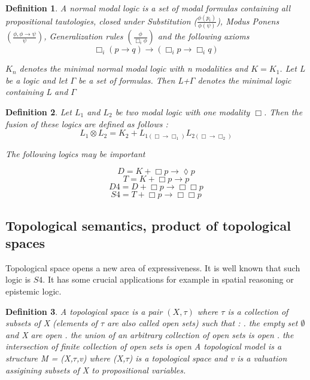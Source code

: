 \documentclass[12pt, a4paper]{scrartcl}
\newtheorem{definition}{Definition}[subsection]
\begin{document}
\begin{definition}
A normal modal logic is a set of modal formulas containing all propositional tautologies,
closed under Substitution ($\frac{\phi(p_i)}{\phi(\psi)}$), Modus Ponens 
$(\frac{\phi, \phi \rightarrow \psi}{\psi})$, Generalization rules $(\frac{\phi}{\Box_i \phi})$
and the following axioms 
$$ \Box_i (p \rightarrow q) \rightarrow (\Box_i p \rightarrow \Box_i q)$$

$K_n$ denotes the minimal normal modal logic with n modalities and $K = K_1$.
Let L be a logic and let $\Gamma$ be a set of formulas. Then L+$\Gamma$ denotes 
the minimal logic containing L and $\Gamma$
\end{definition}


\begin{definition}
Let $L_1$ and $L_2$ be two modal logic with one modality $\Box$. Then the fusion of these 
logics are defined as follows :
$$ L_1 \otimes L_2 = K_2 + L_{1(\Box \rightarrow \Box_1)} L_{2(\Box \rightarrow \Box_2)} $$

The following logics may be important 

$$D = K + \Box p \rightarrow \lozenge p$$
$$T = K + \Box p \rightarrow p$$
$$D4 = D + \Box p \rightarrow \Box \Box p$$
$$S4 = T + \Box p \rightarrow \Box \Box p$$   
\end{definition}

\subsection{Topological semantics, product of topological spaces}
Topological space opens a new area of expressiveness. It is well known that such logic is $S4$. It has some crucial applications for example in spatial reasoning or epistemic logic.

\begin{definition}
    A topological space is a pair $(X, \tau)$ where $\tau$ is a collection of subsets of X (elements of $\tau$ are also called open sets) such that : 
    \newline
    . the empty set $\emptyset $ and X are open
    . the union of an arbitrary collection of open sets is open
    . the intersection of finite collection of open sets is open
    \newline
    \newline
    A topological model is a structure M = (X,$\tau$,v) where (X,$\tau$) is a topological space
    and v is a valuation assigining subsets of X to propositional variables. 
        
\end{definition}
\end{document}
